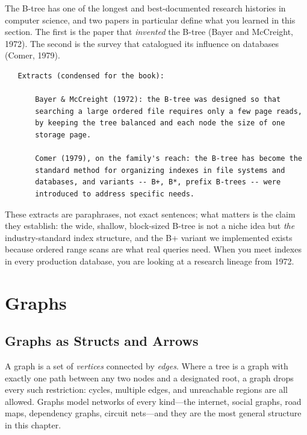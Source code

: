 \begin{researchnote}
The B-tree has one of the longest and best-documented research
histories in computer science, and two papers in particular define
what you learned in this section. The first is the paper that
\emph{invented} the B-tree (Bayer and McCreight, 1972). The second is
the survey that catalogued its influence on databases (Comer, 1979).

\begin{verbatim}
   Extracts (condensed for the book):

       Bayer & McCreight (1972): the B-tree was designed so that
       searching a large ordered file requires only a few page reads,
       by keeping the tree balanced and each node the size of one
       storage page.

       Comer (1979), on the family's reach: the B-tree has become the
       standard method for organizing indexes in file systems and
       databases, and variants -- B+, B*, prefix B-trees -- were
       introduced to address specific needs.
\end{verbatim}

These extracts are paraphrases, not exact sentences; what matters is
the claim they establish: the wide, shallow, block-sized B-tree is not
a niche idea but \emph{the} industry-standard index structure, and the
B+ variant we implemented exists because ordered range scans are what
real queries need. When you meet  indexes in every
production database, you are looking at a research lineage from 1972.


\end{researchnote}

\section{Graphs}

\subsection{Graphs as Structs and Arrows}

A graph is a set of \emph{vertices} connected by \emph{edges}. Where a
tree is a graph with exactly one path between any two nodes and a
designated root, a graph drops every such restriction: cycles, multiple
edges, and unreachable regions are all allowed. Graphs model networks of
every kind---the internet, social graphs, road maps, dependency graphs,
circuit nets---and they are the most general structure in this chapter.

